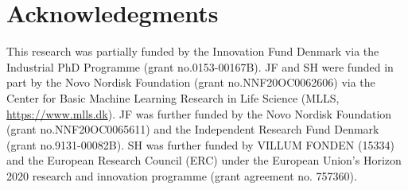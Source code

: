 {\section*{Acknowledegments}
This research was partially funded by the Innovation Fund Denmark via the Industrial PhD Programme (grant no.\@ 0153-00167B). JF and SH were funded in part by the Novo Nordisk Foundation (grant no.\@ NNF20OC0062606) via the Center for Basic Machine Learning Research in Life Science (MLLS, \hyperlink{https://www.mlls.dk}{https://www.mlls.dk}). JF was further funded by the Novo Nordisk Foundation (grant no.\@ NNF20OC0065611) and the Independent Research Fund Denmark (grant no.\@ 9131-00082B). SH was further funded by VILLUM FONDEN (15334) and the European Research Council (ERC) under the European Union’s Horizon 2020 research and innovation programme (grant agreement no. 757360).

}
